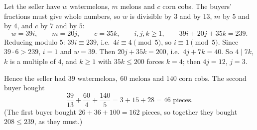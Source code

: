Let the seller have $w$ watermelons, $m$ melons and $c$ corn cobs. The buyers' fractions must give whole numbers, so $w$ is divisible by $3$ and by $13$, $m$ by $5$ and by $4$, and $c$ by $7$ and by $5$:
\[
w=39i,\qquad m=20j,\qquad c=35k,\qquad i,j,k\ge1,\qquad 39i+20j+35k=239 .
\]
Reducing modulo $5$: $39i\equiv239$, i.e.\ $4i\equiv4\pmod5$, so $i\equiv1\pmod5$. Since $39\cdot6>239$, $i=1$ and $w=39$. Then $20j+35k=200$, i.e.\ $4j+7k=40$. So $4\mid7k$, $k$ is a multiple of $4$, and $k\ge1$ with $35k\le200$ forces $k=4$; then $4j=12$, $j=3$.

Hence the seller had $\boxed{39\text{ watermelons},\ 60\text{ melons and }140\text{ corn cobs}}$. The second buyer bought
\[
\dfrac{39}{13}+\dfrac{60}{4}+\dfrac{140}{5}=3+15+28=\boxed{46}\text{ pieces.}
\]
(The first buyer bought $26+36+100=162$ pieces, so together they bought $208\le239$, as they must.)
